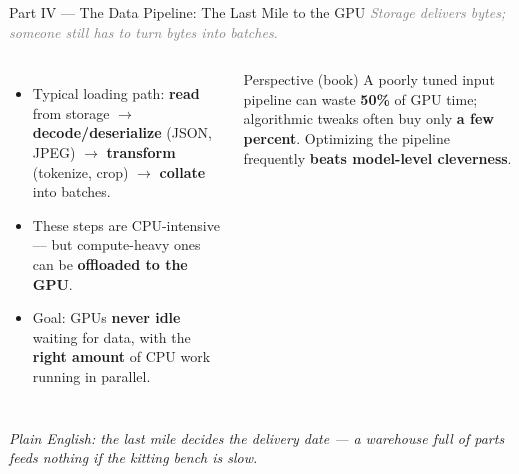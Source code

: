 \documentclass[aspectratio=169]{beamer}
\newcommand{\kw}[1]{\textbf{\textcolor{kwblue}{#1}}}
\newcommand{\pe}[1]{\par{\setlength{\fboxsep}{2.5pt}\noindent\colorbox{navy!9}{\parbox{\dimexpr\textwidth-5pt\relax}{\footnotesize\itshape Plain English: #1}}}}
\newcommand{\bridge}[1]{{\footnotesize\itshape\textcolor{gray}{#1}}\par}
\begin{document}
\begin{frame}{Part IV --- The Data Pipeline: The Last Mile to the GPU}
  \bridge{Storage delivers bytes; someone still has to turn bytes into batches.}
  \begin{columns}[c]
    \begin{itemize}
      \item Typical loading path: \kw{read} from storage $\to$ \kw{decode/deserialize}
            (JSON, JPEG) $\to$ \kw{transform} (tokenize, crop) $\to$ \kw{collate} into batches.
      \item These steps are CPU-intensive --- but compute-heavy ones can be
            \kw{offloaded to the GPU}.
      \item Goal: GPUs \kw{never idle} waiting for data, with the \kw{right amount} of CPU
            work running in parallel.
    \end{itemize}
    \begin{block}{Perspective (book)}
      \small A poorly tuned input pipeline can waste \kw{50\%} of GPU time; algorithmic
      tweaks often buy only \kw{a few percent}. Optimizing the pipeline frequently
      \kw{beats model-level cleverness}.
    \end{block}
  \end{columns}
  \pe{the last mile decides the delivery date --- a warehouse full of parts feeds nothing if the kitting bench is slow.}
\end{frame}
\end{document}
